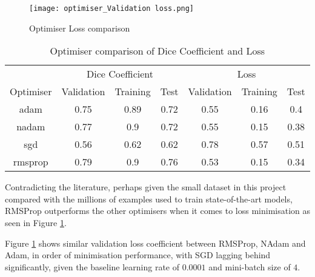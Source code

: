 \begin{figure}[hbt!]
    \centering
    \texttt{[image: optimiser\_Validation loss.png]}
    \caption{Optimiser Loss comparison}
    \label{opt_loss}
\end{figure}

\begin{table}[ht!] 
    \begin{center}
    \begin{tabular}{ccccccc} 
    \toprule
       & \multicolumn{3}{c}{Dice Coefficient}     & \multicolumn{3}{c}{Loss} \\
    Optimiser & Validation & Training & Test & Validation & Training & Test  \\ \midrule

    adam & 0.75 & 0.89 & 0.72 & 0.55 & 0.16 & 0.4  \\ nadam & 0.77 & 0.9 & 0.72 & 0.55 & 0.15 & 0.38  \\ sgd & 0.56 & 0.62 & 0.62 & 0.78 & 0.57 & 0.51  \\ \rowcolor{lightgray} rmsprop & 0.79 & 0.9 & 0.76 & 0.53 & 0.15 & 0.34  \\ 
    
    \bottomrule
    \end{tabular}
  \end{center} 
  \caption{Optimiser comparison of Dice Coefficient and Loss}\label{tab_opt}
\end{table}

Contradicting the literature, perhaps given the small dataset in this project compared with the millions of examples used to train state-of-the-art models, \gls{RMSProp} outperforms the other optimisers when it comes to loss minimisation as seen in Figure \ref{opt_loss}.

Figure \ref{opt_loss} shows similar validation loss coefficient between \gls{RMSProp}, \gls{NAdam} and \gls{Adam}, in order of minimisation performance, with \gls{SGD} lagging behind significantly, given the baseline learning rate of $0.0001$ and mini-batch size of $4$.

